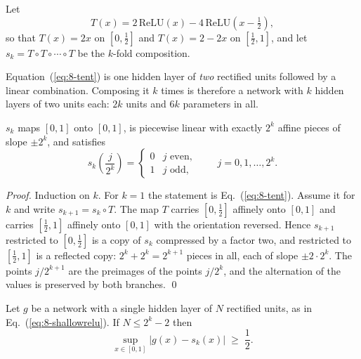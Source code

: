 \begin{definition}
\label{def:8-tent}
Let
\begin{equation}
  T(x) = 2\,\mathrm{ReLU}(x) - 4\,\mathrm{ReLU}\!\left(x-\tfrac{1}{2}\right),
  \label{eq:8-tent}
\end{equation}
so that $T(x)=2x$ on $[0,\tfrac12]$ and $T(x)=2-2x$ on $[\tfrac12,1]$, and let
$s_k=T\circ T\circ\cdots\circ T$ be the $k$-fold composition.
\end{definition}

Equation~(\ref{eq:8-tent}) is one hidden layer of \emph{two} rectified units
followed by a linear combination.  Composing it $k$ times is therefore a
network with $k$ hidden layers of two units each: $2k$ units and $6k$
parameters in all.

\begin{lemma}
\label{lem:8-sawtooth}
$s_k$ maps $[0,1]$ onto $[0,1]$, is piecewise linear with exactly $2^{k}$
affine pieces of slope $\pm2^{k}$, and satisfies
\begin{equation}
  s_k\!\left(\frac{j}{2^{k}}\right)
   = \begin{cases} 0 & j \text{ even},\\ 1 & j \text{ odd},\end{cases}
  \qquad j = 0,1,\dots,2^{k}.
  \label{eq:8-sawvalues}
\end{equation}
\end{lemma}

\begin{proof}
Induction on $k$.  For $k=1$ the statement is Eq.~(\ref{eq:8-tent}).  Assume it
for $k$ and write $s_{k+1}=s_k\circ T$.  The map $T$ carries $[0,\tfrac12]$
affinely onto $[0,1]$ and carries $[\tfrac12,1]$ affinely onto $[0,1]$ with the
orientation reversed.  Hence $s_{k+1}$ restricted to $[0,\tfrac12]$ is a copy
of $s_k$ compressed by a factor two, and restricted to $[\tfrac12,1]$ is a
reflected copy: $2^{k}+2^{k}=2^{k+1}$ pieces in all, each of slope
$\pm2\cdot2^{k}$.  The points $j/2^{k+1}$ are the preimages of the points
$j/2^{k}$, and the alternation of the values is preserved by both branches.
\qed
\end{proof}

\begin{theorem}
\label{thm:8-depth}
Let $g$ be a network with a single hidden layer of $N$ rectified units, as in
Eq.~(\ref{eq:8-shallowrelu}).  If $N\le2^{k}-2$ then
\begin{equation}
  \sup_{x\in[0,1]}\left|g(x)-s_k(x)\right| \;\ge\; \frac{1}{2}.
  \label{eq:8-depthsep}
\end{equation}
\end{theorem}

